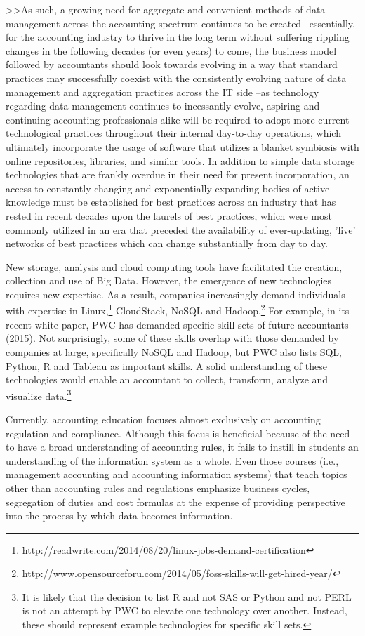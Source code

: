 \documentclass[12pt]{article}
\begin{document}
>>As such, a growing need for aggregate and convenient methods of data management across the accounting spectrum continues to be created-- essentially, for the accounting industry to thrive in the long term without suffering rippling changes in the following decades (or even years) to come, the business model followed by accountants should look towards evolving in a way that standard practices may successfully coexist with the consistently evolving nature of data management and aggregation practices across the IT side --as technology regarding data management continues to incessantly evolve, aspiring and continuing accounting professionals alike will be required to adopt more current technological practices throughout their internal day-to-day operations, which ultimately incorporate the usage of software that utilizes a blanket symbiosis with online repositories, libraries, and similar tools. In addition to simple data storage technologies that are frankly overdue in their need for present incorporation, an access to constantly changing and exponentially-expanding bodies of active knowledge must be established for best practices across an industry that has rested in recent decades upon the laurels of best practices, which were most commonly utilized in an era that preceded the availability of ever-updating, 'live' networks of best practices which can change substantially from day to day.

New storage, analysis and cloud computing tools have facilitated the creation, collection and use of Big Data. However, the emergence of new technologies requires new expertise. As a result, companies increasingly demand individuals with expertise in Linux,\footnote{http://readwrite.com/2014/08/20/linux-jobs-demand-certification} CloudStack, NoSQL and Hadoop.\footnote{http://www.opensourceforu.com/2014/05/foss-skills-will-get-hired-year/} For example, in its recent white paper, PWC has demanded specific skill sets of future accountants (2015). Not surprisingly, some of these skills overlap with those demanded by companies at large, specifically NoSQL and Hadoop, but PWC also lists SQL, Python, R and Tableau as important skills. A solid understanding of these technologies would enable an accountant to collect, transform, analyze and visualize data.\footnote{It is likely that the decision to list R and not SAS or Python and not PERL is not an attempt by PWC to elevate one technology over another. Instead, these should represent example technologies for specific skill sets.}

Currently, accounting education focuses almost exclusively on accounting regulation and compliance. Although this focus is beneficial because of the need to have a broad understanding of accounting rules, it fails to instill in students an understanding of the information system as a whole. Even those courses (i.e., management accounting and accounting information systems) that teach topics other than accounting rules and regulations emphasize business cycles, segregation of duties and cost formulas at the expense of providing perspective into the process by which data becomes information.
\end{document}
